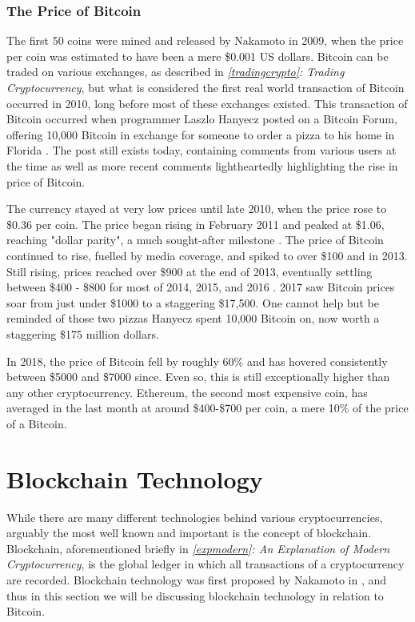 \subsubsection{The Price of Bitcoin}
The first 50 coins were mined and released by Nakamoto in 2009, when the price per coin was estimated to have been a mere \$0.001 US dollars. Bitcoin can be traded on various exchanges, as described in \textit{\ref{tradingcrypto}: Trading Cryptocurrency}, but what is considered the first real world transaction of Bitcoin occurred in 2010, long before most of these exchanges existed. This transaction of Bitcoin occurred when programmer Laszlo Hanyecz posted on a Bitcoin Forum, offering 10,000 Bitcoin in exchange for someone to order a pizza to his home in Florida \cite{btcpizza}. The post still exists today, containing comments from various users at the time as well as more recent comments lightheartedly highlighting the rise in price of Bitcoin. 

The currency stayed at very low prices until late 2010, when the price rose to \$0.36 per coin. The price began rising in February 2011 and peaked at \$1.06, reaching "dollar parity", a much sought-after milestone \cite{BWrisefall}. The price of Bitcoin continued to rise, fuelled by media coverage, and spiked to over \$100 and  in 2013. Still rising, prices reached over \$900 at the end of 2013, eventually settling between \$400 - \$800 for most of 2014, 2015, and 2016 \cite{coindeskprices}. 2017 saw Bitcoin prices soar from just under \$1000 to a staggering \$17,500. One cannot help but be reminded of those two pizzas Hanyecz spent 10,000 Bitcoin on, now worth a staggering \$175 million dollars.

In 2018, the price of Bitcoin fell by roughly 60\% and has hovered consistently between \$5000 and \$7000 since. Even so, this is still exceptionally higher than any other cryptocurrency. Ethereum, the second most expensive coin, has averaged in the last month at around \$400-\$700 per coin, a mere 10\% of the price of a Bitcoin. 

\section{Blockchain Technology}\label{secblockchaintech}
While there are many different technologies behind various cryptocurrencies, arguably the most well known and important is the concept of blockchain. Blockchain, aforementioned briefly in \textit{\ref{expmodern}: An Explanation of Modern Cryptocurrency}, is the global ledger in which all transactions of a cryptocurrency are recorded. Blockchain technology was first proposed by Nakamoto in \cite{snakamoto}, and thus in this section we will be discussing blockchain technology in relation to Bitcoin.


